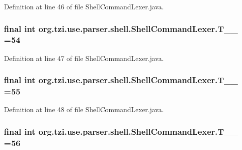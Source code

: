 Definition at line 46 of file Shell\-Command\-Lexer.\-java.

\hypertarget{classorg_1_1tzi_1_1use_1_1parser_1_1shell_1_1_shell_command_lexer_ab5865c355b4369f912645aa42ccaa534}{
\subsubsection[{T\-\_\-\-\_\-54}]{\setlength{\rightskip}{0pt plus 5cm}final int org.\-tzi.\-use.\-parser.\-shell.\-Shell\-Command\-Lexer.\-T\-\_\-\-\_ =54\hspace{0.3cm}{\ttfamily [static]}}}\label{classorg_1_1tzi_1_1use_1_1parser_1_1shell_1_1_shell_command_lexer_ab5865c355b4369f912645aa42ccaa534}


Definition at line 47 of file Shell\-Command\-Lexer.\-java.

\hypertarget{classorg_1_1tzi_1_1use_1_1parser_1_1shell_1_1_shell_command_lexer_a66568670ffd1b3c390aba0c77dc4e878}{
\subsubsection[{T\-\_\-\-\_\-55}]{\setlength{\rightskip}{0pt plus 5cm}final int org.\-tzi.\-use.\-parser.\-shell.\-Shell\-Command\-Lexer.\-T\-\_\-\-\_ =55\hspace{0.3cm}{\ttfamily [static]}}}\label{classorg_1_1tzi_1_1use_1_1parser_1_1shell_1_1_shell_command_lexer_a66568670ffd1b3c390aba0c77dc4e878}


Definition at line 48 of file Shell\-Command\-Lexer.\-java.

\hypertarget{classorg_1_1tzi_1_1use_1_1parser_1_1shell_1_1_shell_command_lexer_ac0e59f12f5033fe3b9903244aed21db2}{
\subsubsection[{T\-\_\-\-\_\-56}]{\setlength{\rightskip}{0pt plus 5cm}final int org.\-tzi.\-use.\-parser.\-shell.\-Shell\-Command\-Lexer.\-T\-\_\-\-\_ =56\hspace{0.3cm}{\ttfamily [static]}}}\label{classorg_1_1tzi_1_1use_1_1parser_1_1shell_1_1_shell_command_lexer_ac0e59f12f5033fe3b9903244aed21db2}


